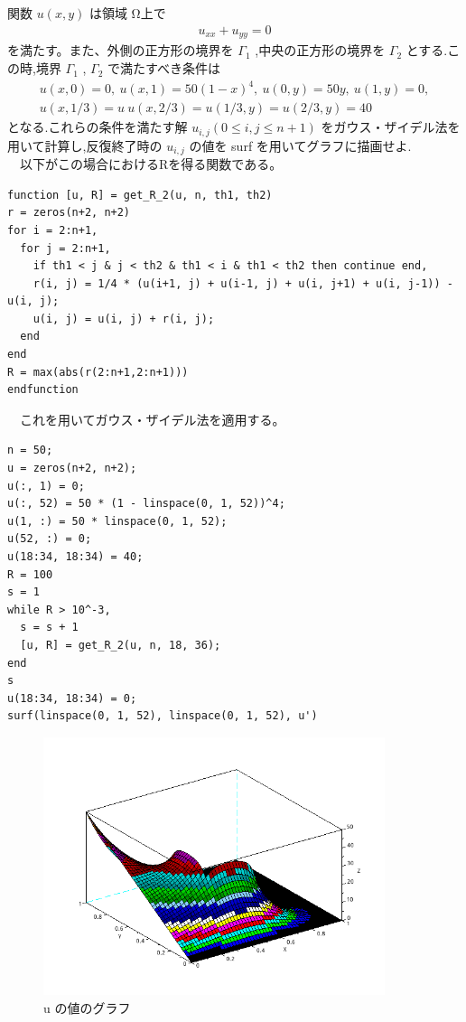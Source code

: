 \documentclass{scrartcl}
\begin{document}
\subsection{}
\label{sec:orgd2415a0}
関数 \(u(x, y)\) は領域 Ω上で\\
\begin{eqnarray*}
u_{xx} + u_{yy} = 0
\end{eqnarray*}
  を満たす。また、外側の正方形の境界を \(\Gamma_1\) ,中央の正方形の境界を \(\Gamma_2\) とする.こ\\
の時,境界 \(\Gamma_1\) , \(\Gamma_2\) で満たすべき条件は\\
\begin{eqnarray*}
u(x, 0) = 0,\ u(x, 1) = 50(1-x)^4 ,\ u(0, y) = 50y,\ u(1, y) = 0, \\
u(x, 1/3) = u \ u(x, 2/3) = u(1/3, y) = u(2/3, y) = 40\ 
\end{eqnarray*}
となる.これらの条件を満たす解 \(u_{i,j} (0 \leq i, j \leq n + 1)\) をガウス・ザイデル法を用いて計算し,反復終了時の \(u_{i,j}\) の値を surf を用いてグラフに描画せよ. \\
　以下がこの場合におけるRを得る関数である。\\
\begin{verbatim}
function [u, R] = get_R_2(u, n, th1, th2)
r = zeros(n+2, n+2)
for i = 2:n+1,
  for j = 2:n+1,
    if th1 < j & j < th2 & th1 < i & th1 < th2 then continue end, 
    r(i, j) = 1/4 * (u(i+1, j) + u(i-1, j) + u(i, j+1) + u(i, j-1)) - u(i, j);
    u(i, j) = u(i, j) + r(i, j);
  end
end
R = max(abs(r(2:n+1,2:n+1)))
endfunction
\end{verbatim}
　これを用いてガウス・ザイデル法を適用する。\\
\begin{verbatim}
n = 50;
u = zeros(n+2, n+2);
u(:, 1) = 0;
u(:, 52) = 50 * (1 - linspace(0, 1, 52))^4;
u(1, :) = 50 * linspace(0, 1, 52);
u(52, :) = 0;
u(18:34, 18:34) = 40;
R = 100
s = 1
while R > 10^-3,
  s = s + 1
  [u, R] = get_R_2(u, n, 18, 36);
end
s
u(18:34, 18:34) = 0;
surf(linspace(0, 1, 52), linspace(0, 1, 52), u')   
\end{verbatim}
\begin{figure}[htbp]
\centering
\includegraphics[width=10cm]{./2-2.png}
\caption{u の値のグラフ}
\end{figure}
\end{document}
